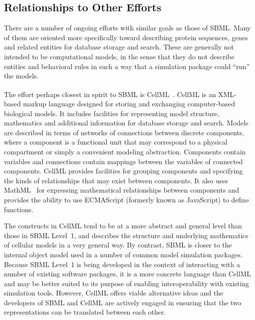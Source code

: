 \documentclass[10pt]{cekarticle}
\newcommand{\tm}{\textsuperscript{\tiny{\texttrademark}}}
\newcommand{\changed}[1]{\textcolor{BrickRed}{#1}}
\begin{document}
\subsection{Relationships to Other Efforts}
\label{sec:other-efforts}


There are a number of ongoing efforts with similar goals as those of SBML.
Many of them are oriented more specifically toward describing protein
sequences, genes and related entities for database storage and search.
These are generally not intended to be computational models, in the sense
that they do not describe entities and behavioral rules in such a way that
a simulation package could ``run'' the models.

The effort perhaps closest in spirit to SBML is
CellML\tm~\changed{\citep{hedley:2001,hedley:2001b,physiome:2001}}.  CellML
is an XML-based markup language designed for storing and exchanging
computer-based biological models.  It includes facilities for representing
model structure, mathematics and additional information for database
storage and search.  Models are described in terms of networks of
connections between discrete components, where a component is a functional
unit that may correspond to a physical compartment or simply a convenient
modeling abstraction.  Components contain variables and connections contain
mappings between the variables of connected components.  CellML provides
facilities for grouping components and specifying the kinds of
relationships that may exist between components.  It also uses
MathML~\citep{w3c:2000b} for expressing mathematical relationships between
components and provides the ability to use ECMAScript (formerly known as
JavaScript) to define functions.

The constructs in CellML tend to be at a more abstract and general level
than those in SBML Level~1, and describes the structure and underlying
mathematics of cellular models in a very general way.  By contrast, SBML is
closer to the internal object model used in \changed{a number of common
  model simulation packages}.  Because SBML Level~1 is being developed in
the context of interacting with a number of existing software packages,
it is a more concrete language than CellML and may be better suited to its
purpose of enabling interoperability with existing simulation tools.
However, CellML offers viable alternative ideas and the developers of SBML
and CellML are actively engaged in ensuring that the two representations
can be translated between each other.
\end{document}
